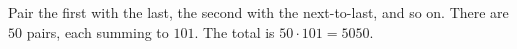Pair the first with the last, the second with the next-to-last, and so on. There are $50$ pairs, each summing to $101$. The total is $50\cdot101=\boxed{5050}$.
